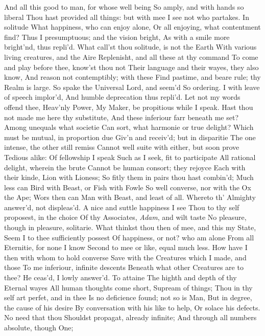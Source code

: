\documentclass[11pt]{book}
\begin{document}
And all this good to man, for whose well being 
So amply, and with hands so liberal 
Thou hast provided all things: but with mee 
I see not who partakes.  In solitude 
What happiness, who can enjoy alone, 
Or all enjoying, what contentment find? 
Thus I presumptuous; and the vision bright, 
As with a smile more bright'nd, thus repli'd. 
\quad What call'st thou solitude, is not the Earth 
With various living creatures, and the Aire 
Replenisht, and all these at thy command 
To come and play before thee, know'st thou not 
Their language and their wayes, they also know, 
And reason not contemptibly; with these 
Find pastime, and beare rule; thy Realm is large. 
So spake the Universal Lord, and seem'd 
So ordering.  I with leave of speech implor'd, 
And humble deprecation thus repli'd. 
\quad Let not my words offend thee, Heav'nly Power, 
My Maker, be propitious while I speak. 
Hast thou not made me here thy substitute, 
And these inferiour farr beneath me set? 
Among unequals what societie 
Can sort, what harmonie or true delight? 
Which must be mutual, in proportion due 
Giv'n and receiv'd; but in disparitie 
The one intense, the other still remiss 
Cannot well suite with either, but soon prove 
Tedious alike: Of fellowship I speak 
Such as I seek, fit to participate 
All rational delight, wherein the brute 
Cannot be human consort; they rejoyce 
Each with their kinde, Lion with Lioness; 
So fitly them in pairs thou hast combin'd; 
Much less can Bird with Beast, or Fish with Fowle 
So well converse, nor with the Ox the Ape; 
Wors then can Man with Beast, and least of all. 
\quad Whereto th' Almighty answer'd, not displeas'd. 
A nice and suttle happiness I see 
Thou to thy self proposest, in the choice 
Of thy Associates, \textit{Adam}, and wilt taste 
No pleasure, though in pleasure, solitarie. 
What thinkst thou then of mee, and this my State, 
Seem I to thee sufficiently possest 
Of happiness, or not? who am alone 
From all Eternitie, for none I know 
Second to mee or like, equal much less. 
How have I then with whom to hold converse 
Save with the Creatures which I made, and those 
To me inferiour, infinite descents 
Beneath what other Creatures are to thee? 
\quad He ceas'd, I lowly answer'd.  To attaine 
The highth and depth of thy Eternal wayes 
All human thoughts come short, Supream of things; 
Thou in thy self art perfet, and in thee 
Is no deficience found; not so is Man, 
But in degree, the cause of his desire 
By conversation with his like to help, 
Or solace his defects.  No need that thou 
Shouldst propagat, already infinite; 
And through all numbers absolute, though One; 
\end{document}
